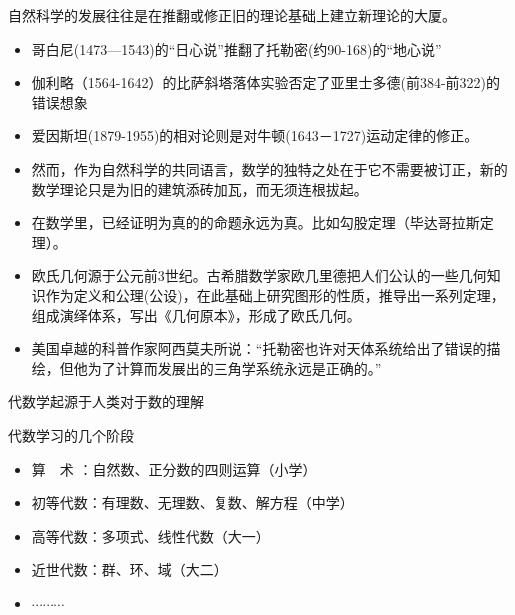 \documentclass[13pt,fontset=mac]{ctexbeamer}
\begin{document}
\begin{frame}
	自然科学的发展往往是在推翻或修正旧的理论基础上建立新理论的大厦。
	\begin{itemize}
		\item 哥白尼(1473—1543)的``日心说''推翻了托勒密(约90-168)的``地心说''
		\item 伽利略（1564-1642）的比萨斜塔落体实验否定了亚里士多德(前384-前322)的错误想象
		\item 爱因斯坦(1879-1955)的相对论则是对牛顿(1643－1727)运动定律的修正。
	\end{itemize}
\end{frame}



		\begin{frame}
	\begin{itemize}
		\item 然而，作为自然科学的共同语言，数学的独特之处在于它不需要被订正，新的数学理论只是为旧的建筑添砖加瓦，而无须连根拔起。
		\item 在数学里，已经证明为真的的命题永远为真。比如勾股定理（毕达哥拉斯定理）。
		\item 欧氏几何源于公元前3世纪。古希腊数学家欧几里德把人们公认的一些几何知识作为定义和公理(公设)，在此基础上研究图形的性质，推导出一系列定理，组成演绎体系，写出《几何原本》，形成了欧氏几何。
		\item 美国卓越的科普作家阿西莫夫所说：“托勒密也许对天体系统给出了错误的描绘，但他为了计算而发展出的三角学系统永远是正确的。”
	\end{itemize}
\end{frame}

\begin{frame}
	代数学起源于人类对于数的理解

	\vspace{6pt}

	代数学习的几个阶段
	\begin{itemize}
		\item 算~~术 ：自然数、正分数的四则运算（小学）
		\item 初等代数：有理数、无理数、复数、解方程（中学）
		\item 高等代数：多项式、线性代数（大一）
		\item 近世代数：群、环、域（大二）
		\item $\cdots \cdots\cdots$
	\end{itemize}
\end{frame}
\end{document}
